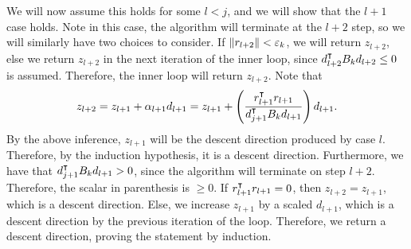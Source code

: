 \begin{solution}
\begin{itemize}
        \hop 
        We will now assume this holds for some $l < j$, and we will show that the $l+1$ case holds. Note in this case, the algorithm will terminate at the $l+2$ step, so we will similarly have two choices to consider. If $\norm{r_{l+2}} < \varepsilon_k$, we will return $z_{l+2}$, else we return $z_{l+2}$ in the next iteration of the inner loop, since $d_{l+2}^\intercal B_k d_{l+2} \leq 0$ is assumed. Therefore, the inner loop will return $z_{l+2}$. Note that 
        \[z_{l+2} = z_{l+1} + \alpha_{l+1}d_{l+1} = z_{l+1} + \left( \frac{r_{l+1}^\intercal r_{l+1}}{d_{j+1}^\intercal B_kd_{l+1}}\right)d_{l+1}.\]
        By the above inference, $z_{l+1}$ will be the descent direction produced by case $l$. Therefore, by the induction hypothesis, it is a descent direction. Furthermore, we have that $d_{j+1}^\intercal B_kd_{l+1} > 0$, since the algorithm will terminate on step $l + 2$. Therefore, the scalar in parenthesis is $\geq 0$. If $r_{l+1}^\intercal r_{l+1} = 0$, then $z_{l+2} = z_{l+1}$, which is a descent direction. Else, we increase $z_{l+1}$ by a scaled $d_{l+1}$, which is a descent direction by the previous iteration of the loop. Therefore, we return a descent direction, proving the statement by induction.  
    \end{itemize}
\end{solution}

\newpage
